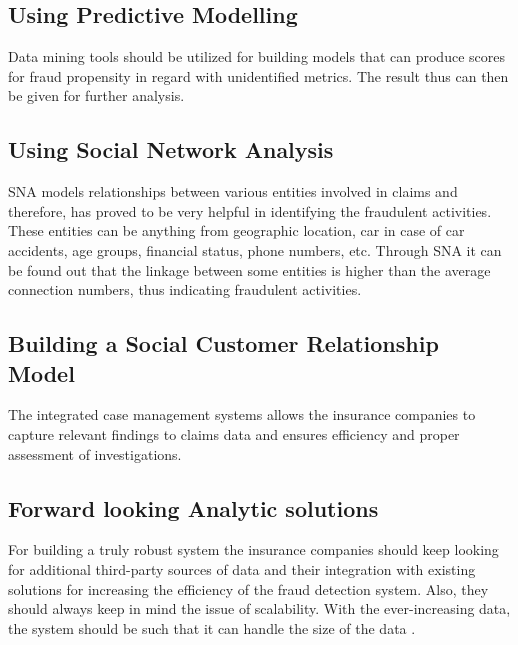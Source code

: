 \documentclass[sigconf]{acmart}
\begin{document}
\subsection{Using Predictive Modelling}
Data mining tools should be utilized for building models that can produce scores for fraud propensity in regard with unidentified metrics. The result thus can then be given for further analysis.
\subsection{Using Social Network Analysis}
SNA models relationships between various entities involved in claims and therefore, has proved to be very helpful in identifying the fraudulent activities. These entities can be anything from geographic location, car in case of car accidents, age groups, financial status, phone numbers, etc. Through SNA it can be found out that the linkage between some entities is higher than the average connection numbers, thus indicating fraudulent activities.
\subsection{Building a Social Customer Relationship Model}
The integrated case management systems allows the insurance companies to capture relevant findings to claims data and ensures efficiency and proper assessment of investigations.
\subsection{Forward looking Analytic solutions}
For building a truly robust system the insurance companies should keep looking for additional third-party sources of data and their integration with existing solutions for increasing the efficiency of the fraud detection system. Also, they should always keep in mind the issue of scalability. With the ever-increasing data, the system should be such that it can handle the size of the data \cite{link7}.
\end{document}
